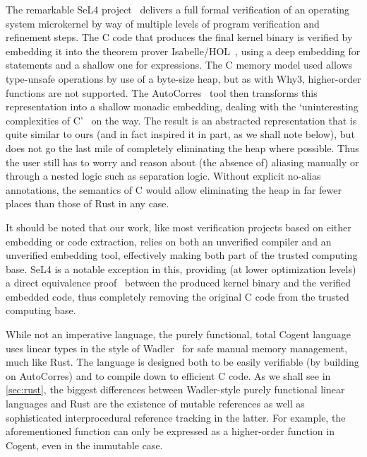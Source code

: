 The remarkable SeL4 project~\cite{klein2009sel4} delivers a full formal verification of an operating
system microkernel by way of multiple levels of program verification and
refinement steps. The C code that produces the final kernel binary is verified
by embedding it into the theorem prover
Isabelle/HOL~\cite{nipkow2002isabelle}, using a deep embedding for statements
and a shallow one for expressions. The C memory model used allows type-unsafe
operations by use of a byte-size heap, but as with Why3, higher-order functions are
not supported. The AutoCorres~\cite{greenaway2012bridging, greenaway2014don}
tool then transforms this representation into a shallow monadic embedding,
dealing with the `uninteresting complexities of C'~\cite{greenaway2014don} on the
way. The result is an abstracted representation that is quite similar to ours
(and in fact inspired it in part, as we shall note below), but does not go the
last mile of completely eliminating the heap where possible. Thus the user still
has to worry and reason about (the absence of) aliasing manually or through a
nested logic such as separation logic. Without explicit
no-alias annotations, the semantics of C would allow eliminating the heap in far fewer places than those
of Rust in any case.

It should be noted that our work, like most verification projects based on
either embedding or code extraction, relies on both
an unverified compiler and an unverified embedding tool, effectively making both
part of the trusted computing base. SeL4 is a notable exception in this,
providing (at lower optimization levels) a direct equivalence proof~\cite{sewell2013translation} between the
produced kernel binary and the verified embedded code, thus completely removing
the original C code from the trusted computing base.

While not an imperative language, the purely functional, total Cogent language~\cite{o2016refinement}
uses linear types in the style of Wadler~\cite{wadler1990linear} for safe
manual memory management, much like Rust. The language is designed both to be
easily verifiable (by building on AutoCorres) and to
compile down to efficient C code. As we shall see in \autoref{sec:rust}, the
biggest differences between Wadler-style purely functional linear languages and Rust are the
existence of mutable references as well as sophisticated interprocedural
reference tracking in the latter. For example, the aforementioned 
function can only be expressed as a higher-order function in Cogent, even in the immutable case.